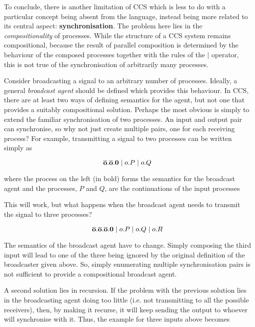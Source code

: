 To conclude, there is another limitation of CCS which is less to do
with a particular concept being absent from the language, instead
being more related to its central aspect: \textbf{synchronisation}.
The problem here lies in the \emph{compositionality} of processes.
While the structure of a CCS system remains compositional, because the
result of parallel composition is determined by the behaviour of the
composed processes together with the rules of the $|$ operator, this
is not true of the synchronisation of arbitrarily many processes.

Consider broadcasting a signal to an arbitrary number of processes.
Ideally, a general \emph{broadcast agent} should be defined which
provides this behaviour.  In CCS, there are at least two ways of
defining semantics for the agent, but not one that provides a suitably
compositional solution.  Perhaps the most obvious is simply to extend
the familiar synchronisation of two processes.  An input and output
pair can synchronise, so why not just create multiple pairs, one for
each receiving process?  For example, transmitting a signal to two
processes can be written simply as

\begin{equation}
\mathbf{\overline{o}.\overline{o}.0} \;|\; o.P \;|\; o.Q
\end{equation}

\noindent where the process on the left (in bold) forms the semantics
for the broadcast agent and the processes, $P$ and $Q$, are the
continuations of the input processes

This will work, but what happens when the broadcast agent needs to
transmit the signal to three processes?

\begin{equation}
\mathbf{\overline{o}.\overline{o}.\overline{o}.0} \;|\; o.P \;|\; o.Q \;|\; o.R
\end{equation}

\noindent The semantics of the broadcast agent have to change.  Simply
composing the third input will lead to one of the three being ignored
by the original definition of the broadcaster given above.  So, simply
enumerating multiple synchronisation pairs is not sufficient to
provide a compositional broadcast agent.

A second solution lies in recursion.  If the problem with the previous
solution lies in the broadcasting agent doing too little (i.e. not
transmitting to all the possible receivers), then, by making it
recurse, it will keep sending the output to whoever will synchronise
with it.  Thus, the example for three inputs above becomes

